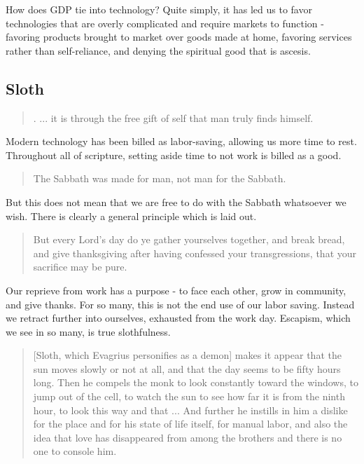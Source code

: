 \documentclass[letterpaper]{article}
\begin{document}
How does GDP tie into technology? Quite simply, it has led us to favor technologies that are overly complicated and require markets to function - favoring products brought to market over goods made at home, favoring services rather than self-reliance, and denying the spiritual good that is ascesis.


\subsection{Sloth}

\begin{quote}.
  ... it is through the free gift of self that man truly finds himself.
\end{quote}

Modern technology has been billed as labor-saving, allowing us more time to rest. Throughout all of scripture, setting aside time to not work is billed as a good.

\begin{quote}
  The Sabbath was made for man, not man for the Sabbath.
\end{quote}

But this does not mean that we are free to do with the Sabbath whatsoever we wish. There is clearly a general principle which is laid out.

\begin{quote}
  But every Lord's day do ye gather yourselves together, and break bread, and give thanksgiving after having confessed your transgressions, that your sacrifice may be pure.
\end{quote}

Our reprieve from work has a purpose - to face each other, grow in community, and give thanks. For so many, this is not the end use of our labor saving. Instead we retract further into ourselves, exhausted from the work day. Escapism, which we see in so many, is true slothfulness.

\begin{quote}
  [Sloth, which Evagrius personifies as a demon] makes it appear that the sun moves slowly or not at all, and that the day seems to be fifty hours long. Then he compels the monk to look constantly toward the windows, to jump out of the cell, to watch the sun to see how far it is from the ninth hour, to look this way and that ... And further he instills in him a dislike for the place and for his state of life itself, for manual labor, and also the idea that love has disappeared from among the brothers and there is no one to console him.
\end{quote}
\end{document}

